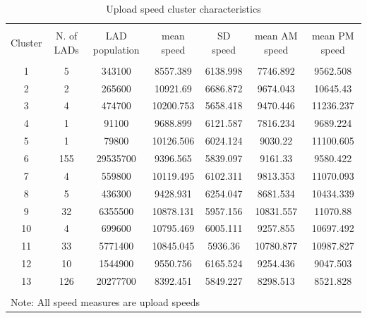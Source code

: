 \documentclass[]{interact}
\theoremstyle{plain}%
\theoremstyle{definition}
\theoremstyle{remark}
\begin{document}
\begin{table}[!htbp] \centering 
  \caption{Upload speed cluster characteristics\label{up.cluster.descr}} 
  \label{} 
\footnotesize 
\begin{tabular}{@{\extracolsep{0pt}} ccccccc} 
\\[-1.8ex]\hline 
\hline \\[-1.8ex] 
Cluster & N. of LADs & LAD population & mean speed & SD speed & mean AM speed & mean PM speed \\ 
\hline \\[-1.8ex] 
1 & 5 & 343100 & 8557.389 & 6138.998 & 7746.892 & 9562.508 \\ 
2 & 2 & 265600 & 10921.69 & 6686.872 & 9674.043 & 10645.43 \\ 
3 & 4 & 474700 & 10200.753 & 5658.418 & 9470.446 & 11236.237 \\ 
4 & 1 & 91100 & 9688.899 & 6121.587 & 7816.234 & 9689.224 \\ 
5 & 1 & 79800 & 10126.506 & 6024.124 & 9030.22 & 11100.605 \\ 
6 & 155 & 29535700 & 9396.565 & 5839.097 & 9161.33 & 9580.422 \\ 
7 & 4 & 559800 & 10119.495 & 6102.311 & 9813.353 & 11070.093 \\ 
8 & 5 & 436300 & 9428.931 & 6254.047 & 8681.534 & 10434.339 \\ 
9 & 32 & 6355500 & 10878.131 & 5957.156 & 10831.557 & 11070.88 \\ 
10 & 4 & 699600 & 10795.469 & 6005.111 & 9257.855 & 10697.492 \\ 
11 & 33 & 5771400 & 10845.045 & 5936.36 & 10780.877 & 10987.827 \\ 
12 & 10 & 1544900 & 9550.756 & 6165.524 & 9254.436 & 9047.503 \\ 
13 & 126 & 20277700 & 8392.451 & 5849.227 & 8298.513 & 8521.828 \\ 
\hline \\[-1.8ex] 
\multicolumn{7}{l}{Note: All speed measures are upload speeds} \\ 
\end{tabular} 
\end{table}
\end{document}
